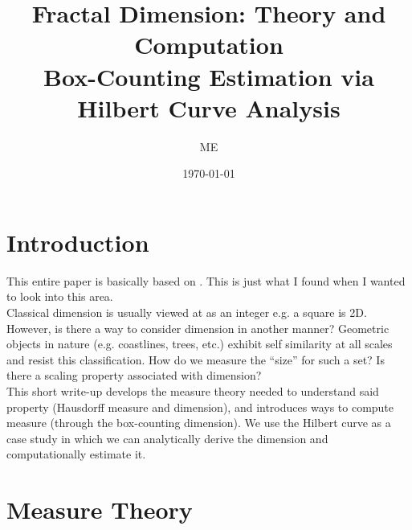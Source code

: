 \documentclass[11pt, a4paper]{article}
\title{%
  \textbf{Fractal Dimension: Theory and Computation}\\[0.4em]
  \large Box-Counting Estimation via Hilbert Curve Analysis
}
\author{ME}
\date{\today}
\theoremstyle{plain}
\theoremstyle{definition}
\theoremstyle{remark}
\begin{document}
\maketitle
\tableofcontents
\newpage

\section{Introduction}
\label{sec:intro}

This entire paper is basically based on \cite{falconer2003}. This is just what I found when I wanted to look into this area.\\
Classical dimension is usually viewed at as an integer e.g. a square is 2D. However, is there a way to consider dimension in another manner? Geometric objects in nature (e.g. coastlines, trees, etc.) exhibit self similarity at all scales and resist this classification. How do we measure the ``size'' for such a set? Is there a scaling property associated with dimension?\\
This short write-up develops the measure theory needed to understand said property (Hausdorff measure and dimension), and introduces ways to compute measure (through the box-counting dimension). We use the Hilbert curve as a case study in which we can analytically derive the dimension and computationally estimate it.
\newpage
\section{Measure Theory}
\end{document}
